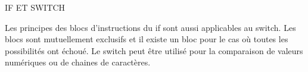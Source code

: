 \documentclass{tufte-handout}
\begin{document}
IF ET SWITCH

Les principes des blocs d'instructions du if sont aussi applicables au switch. Les blocs sont mutuellement exclusifs et il existe un bloc pour le cas où toutes les possibilités ont échoué.
Le switch peut être utilisé pour la comparaison de valeurs numériques ou de chaines de caractères.


\end{document}
